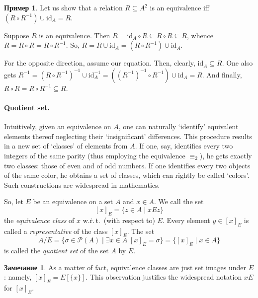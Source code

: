 \documentclass[12pt,notitlepage]{article}
\theoremstyle{plain}
\theoremstyle{definition}
\newtheorem{exm}[thm]{Пример}
\newtheorem{rem}[thm]{Замечание}
\theoremstyle{plain}
\newcommand{\sbs}{\subseteq}
\newcommand{\mP}{\mathcal{P}}
\newcommand{\id}{\mathrm{id}}
\newcommand{\1}{\mathbf{1}}
\newcommand{\0}{\mathbf{0}}
\begin{document}
%
%
\begin{exm}
	Let us show that a relation $R \sbs A^2$ is an equivalence iff $(R \circ R^{-1}) \cup \id_A = R$.
	
	Suppose $R$ is an equivalence. Then $R = \id_A \circ R \sbs R \circ R \sbs R$, whence $R = R \circ R = R \circ R^{-1}$. So, $R = R \cup \id_A = (R \circ R^{-1}) \cup \id_A$.
	
	For the opposite direction, assume our equation. Then, clearly, $\id_A \sbs R$. One also gets $R^{-1} = (R \circ R^{-1})^{-1} \cup \id^{-1}_A = ((R^{-1})^{-1} \circ R^{-1}) \cup \id_A = R$. And finally, $R \circ R = R \circ R^{-1} \sbs R$.
\end{exm}

\paragraph{Quotient set.} Intuitively, given an equivalence on $A$, one can naturally `identify' equivalent elements thereof neglecting their `insignificant' differences. This procedure results in a new set of `classes' of elements from $A$. If one, say, identifies every two integers of the same parity (thus employing the equivalence ${\equiv_2}$), he gets exactly two classes: those of even and of odd numbers. If one identifies every two objects of the same color, he obtains a set of classes, which can rightly be called  `colors'. Such constructions are widespread in mathematics.

So, let $E$ be an equivalence on a set $A$ and $x \in A$. We call the set
$$[x]_E = \{ z \in A \mid x E z \}$$
the \emph{equivalence class} of $x$ w.\.r.\,t.\ (with respect to) $E$. Every element $y \in [x]_E$ is called a \emph{representative} of the class $[x]_E$. The set
$$A/E = \{ \sigma \in \mP(A) \mid \exists x \in A\; [x]_E = \sigma \}  =  \{[x]_E \mid x \in A\}$$
is called the \emph{quotient set} of the set $A$ by $E$.
\begin{rem}
	As a matter of fact, equivalence classes are just set images under $E$: namely, $[x]_E = E[\{x\}]$. This observation justifies the widespread notation $xE$ for $[x]_E$.
\end{rem}
\end{document}
